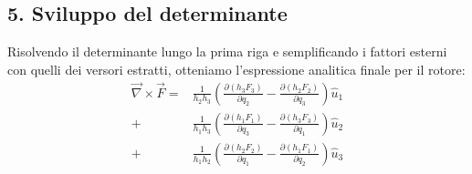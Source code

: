 \documentclass[11pt, a4paper]{article}
\begin{document}
\subsection*{5. Sviluppo del determinante}
Risolvendo il determinante lungo la prima riga e semplificando i fattori esterni con quelli dei versori estratti, otteniamo l'espressione analitica finale per il rotore:
\begin{align*}
    \vec{\nabla} \times \vec{F} = 
    &\frac{1}{h_2 h_3} \left( \frac{\partial (h_3 F_3)}{\partial q_2} - \frac{\partial (h_2 F_2)}{\partial q_3} \right) \hat{u}_1 \\
    + &\frac{1}{h_1 h_3} \left( \frac{\partial (h_1 F_1)}{\partial q_3} - \frac{\partial (h_3 F_3)}{\partial q_1} \right) \hat{u}_2 \\
    + &\frac{1}{h_1 h_2} \left( \frac{\partial (h_2 F_2)}{\partial q_1} - \frac{\partial (h_1 F_1)}{\partial q_2} \right) \hat{u}_3
\end{align*}
\end{document}

